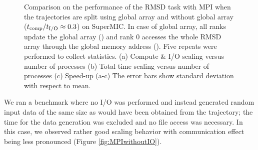 \begin{figure}[ht!]
\caption{Comparison on the performance of the RMSD task with MPI when the trajectories are split using global array and without global array (${t}_{\text{comp}}/{t}_{\text{I/O}} \approx 0.3$) on SuperMIC.
In case of global array, all ranks update the global array () and rank 0 accesses the whole RMSD array through the global memory address ().
Five repeats were performed to collect statistics. (a) Compute \& I/O scaling versus number of processes (b) Total time scaling versus number of processes (c) Speed-up (a-c) The error bars show standard deviation with respect to mean.}
\label{fig:MPIwithIO-split-SuperMIC}
\end{figure}


We ran a benchmark where no I/O was performed and instead generated random input data of the same size as would have been obtained from the trajectory; the time for the data generation was excluded and no file access was necessary. 
In this case, we observed rather good scaling behavior with communication effect being less pronounced (Figure \ref{fig:MPIwithoutIO}).


